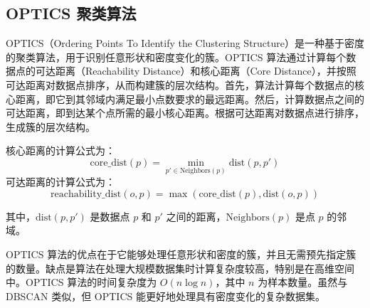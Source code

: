 \documentclass{ctexart} %
\begin{document}
\subsection{OPTICS 聚类算法}

OPTICS（Ordering Points To Identify the Clustering Structure）是一种基于密度的聚类算法，用于识别任意形状和密度变化的簇。OPTICS 算法通过计算每个数据点的可达距离（Reachability Distance）和核心距离（Core Distance），并按照可达距离对数据点排序，从而构建簇的层次结构。首先，算法计算每个数据点的核心距离，即它到其邻域内满足最小点数要求的最远距离。然后，计算数据点之间的可达距离，即到达某个点所需的最小核心距离。根据可达距离对数据点进行排序，生成簇的层次结构。

核心距离的计算公式为：
\[
\text{core\_dist}(p) = \min_{p' \in \text{Neighbors}(p)} \text{dist}(p, p')
\]
可达距离的计算公式为：
\[
\text{reachability\_dist}(o, p) = \max(\text{core\_dist}(p), \text{dist}(o, p))
\]

其中，\(\text{dist}(p, p')\) 是数据点 \(p\) 和 \(p'\) 之间的距离，\(\text{Neighbors}(p)\) 是点 \(p\) 的邻域。

OPTICS 算法的优点在于它能够处理任意形状和密度的簇，并且无需预先指定簇的数量。缺点是算法在处理大规模数据集时计算复杂度较高，特别是在高维空间中。OPTICS 算法的时间复杂度为 \(O(n \log n)\)，其中 \(n\) 为样本数量。虽然与 DBSCAN 类似，但 OPTICS 能更好地处理具有密度变化的复杂数据集。
\end{document}
